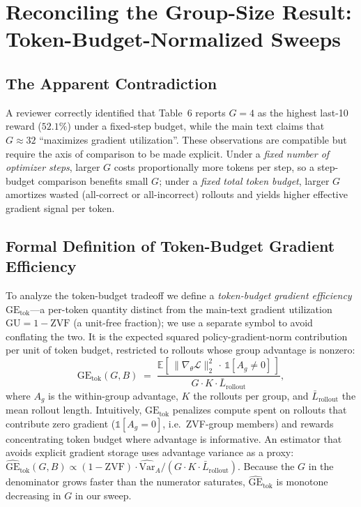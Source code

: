 \documentclass{article}
\begin{document}
\section{Reconciling the Group-Size Result: Token-Budget-Normalized Sweeps}
\label{sec:appendix:group-size-reconcile}

\subsection{The Apparent Contradiction}

A reviewer correctly identified that Table~6 reports $G{=}4$ as the
highest last-10 reward ($52.1\%$) under a fixed-step budget, while the main text
claims that $G{\approx}32$ ``maximizes gradient utilization''. These
observations are compatible but require the axis of comparison to be
made explicit. Under a \emph{fixed number of optimizer steps}, larger
$G$ costs proportionally more tokens per step, so a step-budget
comparison benefits small $G$; under a \emph{fixed total token budget},
larger $G$ amortizes wasted (all-correct or all-incorrect) rollouts
and yields higher effective gradient signal per token.

\subsection{Formal Definition of Token-Budget Gradient Efficiency}

To analyze the token-budget tradeoff we define a \emph{token-budget gradient
efficiency} $\mathrm{GE}_{\text{tok}}$---a per-token quantity distinct from the
main-text gradient utilization $\mathrm{GU}{=}1{-}\mathrm{ZVF}$ (a unit-free
fraction); we use a separate symbol to avoid conflating the two. It is the
expected squared policy-gradient-norm contribution per unit of token budget,
restricted to rollouts whose group advantage is nonzero:
\begin{equation}
\label{eq:gu}
\mathrm{GE}_{\text{tok}}(G, B) \;=\;
\frac{\displaystyle\mathbb{E}\!\left[\,\|\nabla_\theta \mathcal{L}\|_2^{2}\,\cdot\,
  \mathbb{1}\!\left[A_g \ne 0\right]\,\right]}
{\displaystyle G \cdot K \cdot \bar{L}_\text{rollout}},
\end{equation}
where $A_g$ is the within-group advantage, $K$ the rollouts per group,
and $\bar{L}_\text{rollout}$ the mean rollout length.
Intuitively, $\mathrm{GE}_{\text{tok}}$ penalizes compute spent on rollouts that
contribute zero gradient ($\mathbb{1}[A_g\!=\!0]$, i.e.~ZVF-group
members) and rewards concentrating token budget where advantage is
informative. An estimator that avoids explicit gradient storage uses
advantage variance as a proxy:
$\widehat{\mathrm{GE}}_{\text{tok}}(G,B) \!\propto\!
 (1 - \mathrm{ZVF}) \cdot \widehat{\mathrm{Var}}_A / (G\cdot K \cdot \bar{L}_\text{rollout})$.
Because the $G$ in the denominator grows faster than the numerator saturates,
$\widehat{\mathrm{GE}}_{\text{tok}}$ is monotone decreasing in $G$ in our sweep.
\end{document}
